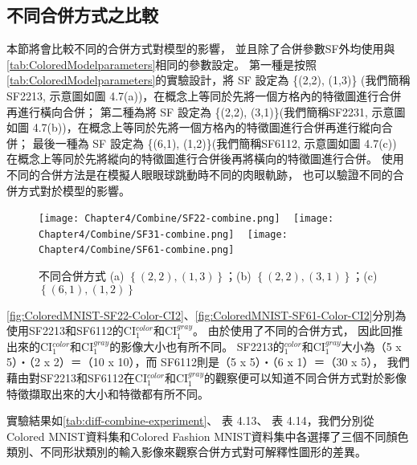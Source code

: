 \documentclass[class=NCU\_thesis, crop=false]{standalone}
\begin{document}
    \pagebreak

    \subsection{不同合併方式之比較}
    本節將會比較不同的合併方式對模型的影響，
    並且除了合併參數SF外均使用與\cref{tab:ColoredModelparameters}相同的參數設定。
    第一種是按照\cref{tab:ColoredModelparameters}的實驗設計，將 SF 設定為 \{(2,2), (1,3)\}
    (我們簡稱SF2213, 示意圖如圖 4.7(a))，在概念上等同於先將一個方格內的特徵圖進行合併再進行橫向合併；
    第二種為將 SF 設定為 \{(2,2), (3,1)\}(我們簡稱SF2231, 示意圖如圖 4.7(b))，在概念上等同於先將一個方格內的特徵圖進行合併再進行縱向合併；
    最後一種為 SF 設定為 \{(6,1), (1,2)\}(我們簡稱SF6112, 示意圖如圖 4.7(c))
    在概念上等同於先將縱向的特徵圖進行合併後再將橫向的特徵圖進行合併。
    使用不同的合併方法是在模擬人眼眼球跳動時不同的肉眼軌跡，
    也可以驗證不同的合併方式對於模型的影響。

    \begin{figure}[H]
        \subcaptionbox
            {
            \label{fig:SF-22}}
            {\texttt{[image: Chapter4/Combine/SF22-combine.png]}}
        ~
        \subcaptionbox
            {
            \label{fig:SF-31}}
            {\texttt{[image: Chapter4/Combine/SF31-combine.png]}}
        ~
        \subcaptionbox
            {
            \label{fig:SF-61}}
            {\texttt{[image: Chapter4/Combine/SF61-combine.png]}}
        ~
        \caption{不同合併方式 (a) $\left\{(2, 2), (1, 3)\right\}$；(b) $\left\{(2, 2), (3, 1)\right\}$；(c) $\left\{(6, 1), (1, 2)\right\}$}
        \label{fig:SF}
    \end{figure}

	\cref{fig:ColoredMNIST-SF22-Color-CI2}、\cref{fig:ColoredMNIST-SF61-Color-CI2}分別為使用SF2213和SF6112的CI$^{color}_{1}$和CI$^{gray}_{1}$。
	由於使用了不同的合併方式，
	因此回推出來的CI$^{color}_{1}$和CI$^{gray}_{1}$的影像大小也有所不同。
	SF2213的$^{color}_{1}$和CI$^{gray}_{1}$大小為（5 x 5）‧（2 x 2）＝（10 x 10），而
    SF6112則是（5 x 5）‧（6 x 1）＝（30 x 5），
    我們藉由對SF2213和SF6112在CI$^{color}_{1}$和CI$^{gray}_{1}$的觀察便可以知道不同合併方式對於影像特徵擷取出來的大小和特徵都有所不同。

    實驗結果如\cref{tab:diff-combine-experiment}、 表 4.13、 表 4.14，我們分別從Colored MNIST資料集和Colored Fashion MNIST資料集中各選擇了三個不同顏色類別、不同形狀類別的輸入影像來觀察合併方式對可解釋性圖形的差異。
\end{document}
